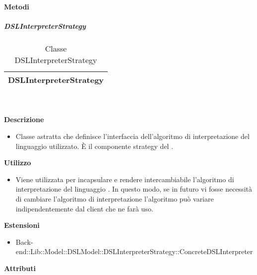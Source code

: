 		\textbf{Metodi} 
	\begin{itemize}
		\end{itemize}
			\subparagraph{DSLInterpreterStrategy} 
\begin{table}[ht]
\begin{center}
\bgroup
	\setlength{\arrayrulewidth}{0.6mm}
	\def\arraystretch{1}
		\begin{tabular}{ | p{12cm} | }
				\hline  
					\centerline{\textbf{DSLInterpreterStrategy}}
		\\ \hline 
				\hline
				\hline
		
		\end{tabular}
\egroup
\caption{Classe DSLInterpreterStrategy}
\end{center}
\end{table}  \textbf{\\ \\ Descrizione} 
					\begin{itemize}
						\item[] Classe astratta che definisce l'interfaccia dell'algoritmo di interpretazione del linguaggio  utilizzato. È il componente strategy del  .
					\end{itemize}      
				\textbf{Utilizzo}  
					\begin{itemize}
						\item[] Viene utilizzata per incapsulare e rendere intercambiabile l'algoritmo di interpretazione del linguaggio . In questo modo, se in futuro vi fosse necessità di cambiare l'algoritmo di interpretazione l'algoritmo può variare indipendentemente dal client che ne farà uso.
					\end{itemize}
					\textbf{Estensioni}
					\begin{itemize}
							\item{Back-end::Lib::Model::DSLModel::DSLInterpreterStrategy::ConcreteDSLInterpreter}
					\end{itemize}
			 \textbf{Attributi} 
	\begin{itemize}
		\end{itemize}
		
